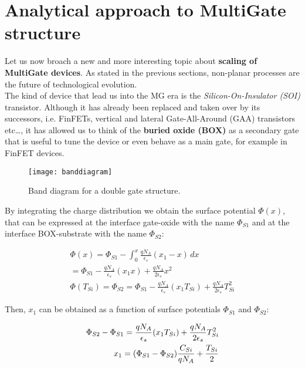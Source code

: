 \documentclass[a4paper, 12pt, twoside, openright]{report}
\begin{document}
\section{Analytical approach to MultiGate structure}
Let us now broach a new and more interesting topic about \textbf{scaling of MultiGate devices}. As stated in the previous sections, non-planar processes are the future of technological evolution.\\
The kind of device that lead us into the MG era is the \emph{Silicon-On-Insulator (SOI)} transistor. Although it has already been replaced and taken over by its successors, i.e. FinFETs, vertical and lateral Gate-All-Around (GAA) transistors etc\dots, it has allowed us to think of the \textbf{buried oxide (BOX)} as a secondary gate that is useful to tune the device or even behave as a main gate, for example in FinFET devices. 

	\begin{figure}[H]
	\centering
	\texttt{[image: banddiagram]}
	\caption{Band diagram for a double gate structure.}
	\label{band}
	\end{figure}

By integrating the charge distribution we obtain the surface potential $\Phi(x)$, that can be expressed at the interface gate-oxide with the name $\Phi_{S1}$ and at the interface BOX-substrate with the name $\Phi_{S2}$:

\begin{eqnarray}
\Phi(x) = \Phi_{S1} - \int_{0}^{x}\frac{q N_A}{\epsilon_s}(x_1 - x)\,dx \\
		= \Phi_{S1} - \frac{q N_A}{\epsilon_s}(x_1 x) + \frac{q N_A}{2\epsilon_s}x^2 \\
\Phi(T_{Si}) = \Phi_{S2} = \Phi_{S1} - \frac{q N_A}{\epsilon_s}(x_1 T_{Si}) + \frac{q N_A}{2\epsilon_s}T_{Si}^2
\end{eqnarray}

Then, \emph{$x_{1}$} can be obtained as a function of surface potentials $\Phi_{S1}$ and $\Phi_{S2}$:

\begin{eqnarray}
\Phi_{S2} - \Phi_{S1} = \frac{q N_A}{\epsilon_s}(x_1 T_{Si}) + \frac{q N_A}{2\epsilon_s}T_{Si}^2 \\
\emph{$x_{1}$} = (\Phi_{S1} - \Phi_{S2}) \frac{C_{Si}}{q N_A} + \frac{T_{Si}}{2}
\end{eqnarray}
\end{document}
